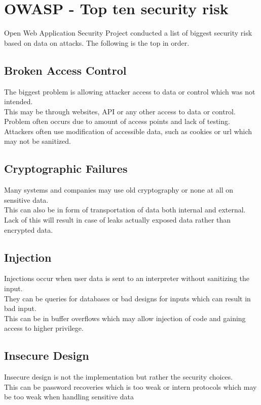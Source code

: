 \documentclass[12pt, a4paper]{article}
\begin{document}
	\section{OWASP - Top ten security risk}
		Open Web Application Security Project conducted a list of biggest security risk based on data on attacks. The following is the top in order. 
		\subsection{Broken Access Control}
			The biggest problem is allowing attacker access to data or control which was not intended.\\
			This may be through websites, API or any other access to data or control.\\
			Problem often occurs due to amount of access points and lack of testing.\\
			Attackers often use modification of accessible data, such as cookies or url which may not be sanitized.
		\subsection{Cryptographic Failures}
			Many systems and companies may use old cryptography or none at all on sensitive data.\\
			This can also be in form of transportation of data both internal and external.\\
			Lack of this will result in case of leaks actually exposed data rather than encrypted data.
		\subsection{Injection}
			Injections occur when user data is sent to an interpreter without sanitizing the input.\\
			They can be queries for databases or bad designs for inputs which can result in bad input.\\
			This can be in buffer overflows which may allow injection of code and gaining access to higher privilege.\\
		\subsection{Insecure Design}
			Insecure design is not the implementation but rather the security choices.\\
			This can be password recoveries which is too weak or intern protocols which may be too weak when handling sensitive data
\end{document}
